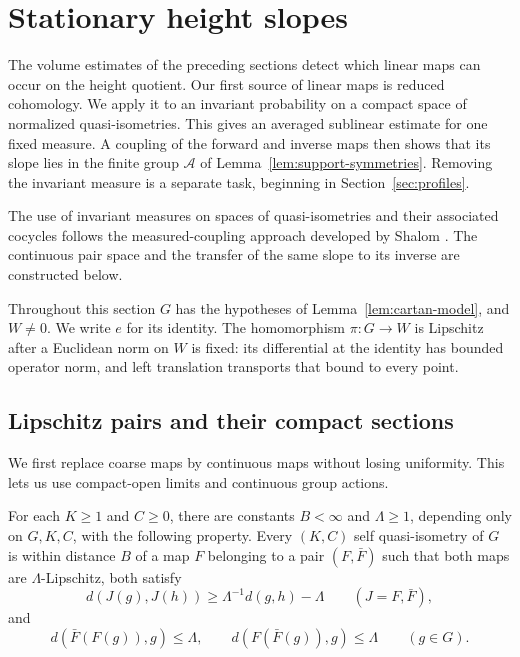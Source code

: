\section{Stationary height slopes}\label{sec:stationary}

The volume estimates of the preceding sections detect which linear maps
can occur on the height quotient.  Our first source of linear maps is
reduced cohomology.  We apply it to an invariant probability on a compact
space of normalized quasi-isometries.  This gives an averaged sublinear
estimate for one fixed measure.  A coupling of the forward and inverse
maps then shows that its slope lies in the finite group $\mathcal A$ of
Lemma~\ref{lem:support-symmetries}.  Removing the invariant measure is a
separate task, beginning in Section~\ref{sec:profiles}.

The use of invariant measures on spaces of quasi-isometries and their
associated cocycles follows the measured-coupling approach developed by
Shalom \cite[Sections~2.1--2.2]{Shalom2004}. The continuous pair space and
the transfer of the same slope to its inverse are constructed below.

Throughout this section $G$ has the hypotheses of
Lemma~\ref{lem:cartan-model}, and $W\ne0$.  We write $e$ for its identity.
The homomorphism $\pi:G\to W$ is Lipschitz after a Euclidean norm on $W$
is fixed: its differential at the identity has bounded operator norm,
and left translation transports that bound to every point.

\subsection{Lipschitz pairs and their compact sections}

We first replace coarse maps by continuous maps without losing
uniformity.  This lets us use compact-open limits and continuous group
actions.

\begin{lemma}\label{lem:lipschitz-pairs}
For each $K\ge1$ and $C\ge0$, there are constants $B<\infty$ and
$\Lambda\ge1$, depending only on $G,K,C$, with the following property.
Every $(K,C)$ self quasi-isometry of $G$ is within distance $B$ of a map
$F$ belonging to a pair $(F,\bar F)$ such that both maps are
$\Lambda$-Lipschitz, both satisfy
\[
 d(J(g),J(h))\ge \Lambda^{-1}d(g,h)-\Lambda
 \qquad(J=F,\bar F),
\]
and
\[
 d(\bar F(F(g)),g)\le\Lambda,\qquad
 d(F(\bar F(g)),g)\le\Lambda
 \qquad(g\in G).
\]
\end{lemma}

